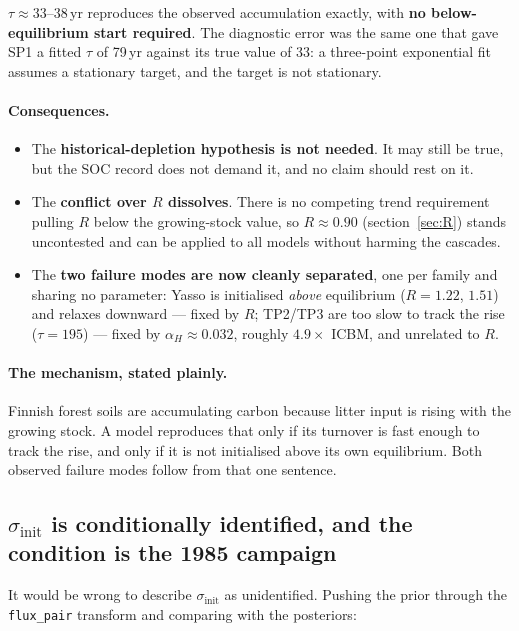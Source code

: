 \documentclass[11pt]{article}
\newcommand{\sinit}{\sigma_{\mathrm{init}}}
\begin{document}
\noindent $\tau \approx 33$--$38$\,yr reproduces the observed accumulation exactly, with
\textbf{no below-equilibrium start required}. The diagnostic error was the same one that gave
SP1 a fitted $\tau$ of 79\,yr against its true value of 33: a three-point exponential fit
assumes a stationary target, and the target is not stationary.

\paragraph{Consequences.}
\begin{itemize}
\item The \textbf{historical-depletion hypothesis is not needed}. It may still be true, but the
SOC record does not demand it, and no claim should rest on it.
\item The \textbf{conflict over $R$ dissolves}. There is no competing trend requirement pulling
$R$ below the growing-stock value, so $R \approx 0.90$ (section~\ref{sec:R}) stands uncontested
and can be applied to all models without harming the cascades.
\item The \textbf{two failure modes are now cleanly separated}, one per family and sharing no
parameter: Yasso is initialised \emph{above} equilibrium ($R = 1.22$, $1.51$) and relaxes
downward --- fixed by $R$; TP2/TP3 are too slow to track the rise ($\tau = 195$) --- fixed by
$\alpha_H \approx 0.032$, roughly $4.9\times$ ICBM, and unrelated to $R$.
\end{itemize}

\paragraph{The mechanism, stated plainly.} Finnish forest soils are accumulating carbon because
litter input is rising with the growing stock. A model reproduces that only if its turnover is
fast enough to track the rise, and only if it is not initialised above its own equilibrium. Both
observed failure modes follow from that one sentence.

\subsection{$\sinit$ is conditionally identified, and the condition is the 1985 campaign}
\label{sec:cond1985}

It would be wrong to describe $\sinit$ as unidentified. Pushing the prior through the
\texttt{flux\_pair} transform and comparing with the posteriors:
\end{document}
